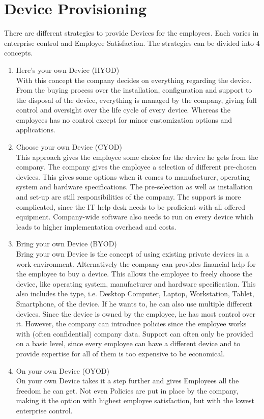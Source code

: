 \section{Device Provisioning}
There are different strategies to provide Devices for the employees. Each varies in enterprise control and Employee Satisfaction. The strategies can be divided into 4 concepts. \parencite{KumarGajar.2013}
\begin{enumerate}
	\item Here's your own Device (HYOD) \\
	With this concept the company decides on everything regarding the device. From the buying process over the installation, configuration and support to the disposal of the device, everything is managed by the company, giving full control and oversight over the life cycle of every device. Whereas the employees has no control except for minor customization options and applications.  \parencite{KumarGajar.2013}
	
	\item Choose your own Device (CYOD) \\
	This approach gives the employee some choice for the device he gets from the company. The company gives the employee a selection of different pre-chosen devices. This gives some options when it comes to manufacturer, operating system and hardware specifications. The pre-selection as well as installation and set-up are still responsibilities of the company. The support is more complicated, since the IT help desk needs to be proficient with all offered equipment. Company-wide software also needs to run on every device which leads to higher implementation overhead and costs. \parencite{KumarGajar.2013}
	
	\item Bring your own Device (BYOD) \\
	Bring your own Device is the concept of using existing private devices in a work environment. Alternatively the company can provides financial help for the employee to buy a device. This allows the employee to freely choose the device, like operating system, manufacturer and hardware specification. This also includes the type, i.e. Desktop Computer, Laptop, Workstation, Tablet, Smartphone, of the device. If he wants to, he can also use multiple different devices. Since the device is owned by the employee, he has most control over it. However, the company can introduce policies since the employee works with (often confidential) company data. Support can often only be provided on a basic level, since every employee can have a different device and to provide expertise for all of them is too expensive to be economical. \parencite{KumarGajar.2013}
	
	\item On your own Device (OYOD) \\
	On your own Device takes it a step further and gives Employees all the freedom he can get. Not even Policies are put in place by the company, making it the option with highest employee satisfaction, but with the lowest enterprise control. \parencite{KumarGajar.2013}
\end{enumerate}
